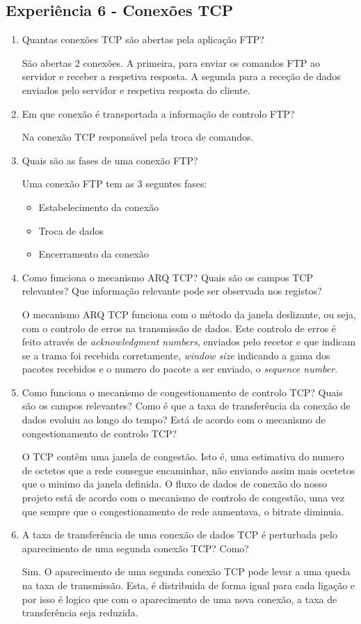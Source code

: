 \documentclass{article}
\begin{document}
\subsection{Experiência 6 - Conexões TCP}
\begin{enumerate}
\item Quantas conexões TCP são abertas pela aplicação FTP?

São abertas 2 conexões. A primeira, para enviar os comandos FTP ao servidor e receber a respetiva resposta.
A segunda para a receção de dados enviados pelo servidor e respetiva resposta do cliente.

\item Em que conexão é transportada a informação de controlo FTP?

Na conexão TCP responsável pela troca de comandos.
\item Quais são as fases de uma conexão FTP?

Uma conexão FTP tem as 3 seguntes fases:
\begin{itemize}
    \item Estabelecimento da conexão
    \item Troca de dados
    \item Encerramento da conexão
\end{itemize}


\item Como funciona o mecanismo ARQ TCP? Quais são os campos TCP relevantes? Que informação relevante pode ser observada nos
registos?

O mecanismo ARQ TCP funciona com o método da janela deslizante, ou seja, com o controlo de erros na transmissão de dados. 
Este controlo de erros é feito através de \textit{acknowledgment numbers}, enviados pelo recetor e que indicam se a trama foi recebida corretamente, \textit{window size} indicando a gama dos pacotes recebidos e o numero do pacote a ser enviado, o \textit{sequence number}.

\item Como funciona o mecanismo de congestionamento de controlo TCP? Quais são os campos relevantes? Como é que
a taxa de transferência da conexão de dados evoluiu ao longo do tempo? Está de acordo com o mecanismo de congestionamento de controlo TCP?

O TCP contêm uma janela de congestão. Isto é, uma estimativa do numero de octetos que a rede consegue encaminhar, não enviando assim mais ocetetos que o minimo da janela definida.
O fluxo de dados de conexão do nosso projeto está de acordo com o mecanismo de controlo de congestão, uma vez que sempre que o congestionamento de rede aumentava, o bitrate diminuia.

\item A taxa de transferência de uma conexão de dados TCP é perturbada pelo aparecimento de uma segunda conexão TCP? Como?

Sim. O aparecimento de uma segunda conexão TCP pode levar a uma queda na taxa de transmissão. Esta, é distribuida de forma igual para cada ligação e por isso é logico que com o aparecimento de uma nova conexão, a taxa de transferência seja reduzida.

\end{enumerate}
\end{document}
